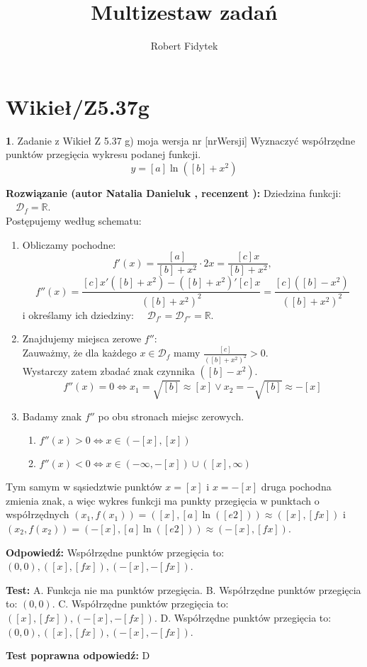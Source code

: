 \documentclass[12pt, a4paper]{article}
\title{Multizestaw zadań}
\author{Robert Fidytek}
\date{}
\theoremstyle{definition} %
\newtheorem{zad}{}
\newcommand{\kategoria}[1]{\section{#1}} %
\newcommand{\zadStart}[1]{\begin{zad}#1\newline} %
\newcommand{\zadStop}{\end{zad}}   %
\newcommand{\rozwStart}[2]{\noindent \textbf{Rozwiązanie (autor #1 , recenzent #2): }\newline} %
\newcommand{\rozwStop}{\newline}                                            %
\newcommand{\odpStart}{\noindent \textbf{Odpowiedź:}\newline}    %
\newcommand{\odpStop}{\newline}                                             %
\newcommand{\testStart}{\noindent \textbf{Test:}\newline} %
\newcommand{\testStop}{\newline} %
\newcommand{\kluczStart}{\noindent \textbf{Test poprawna odpowiedź:}\newline} %
\newcommand{\kluczStop}{\newline} %
\begin{document}
\maketitle

\kategoria{Wikieł/Z5.37g}

\zadStart{Zadanie z Wikieł Z 5.37 g) moja wersja nr [nrWersji]}
Wyznaczyć współrzędne punktów przegięcia wykresu podanej funkcji.
$$y = [a]\ln ([b] + x^2)$$
\zadStop

\rozwStart{Natalia Danieluk}{}
Dziedzina funkcji: $\quad \mathcal{D}_f=\mathbb{R}$. \\
Postępujemy według schematu:
\begin{enumerate}
\item Obliczamy pochodne: 
$$f'(x) = \frac{[a]}{[b] + x^2} \cdot 2x = \frac{[c]x}{[b] + x^2},$$ 
$$f''(x) = \frac{[c]x'([b] + x^2) - ([b] + x^2)'[c]x}{([b] + x^2)^2} = \frac{[c]([b] - x^2)}{([b] + x^2)^2}$$
i określamy ich dziedziny: $\quad \mathcal{D}_{f'}=\mathcal{D}_{f''}=\mathbb{R}$. \\
\item Znajdujemy miejsca zerowe $f''$: \\
Zauważmy, że dla każdego $x \in \mathcal{D}_f$ mamy $\frac{[c]}{([b] + x^2)^2} > 0$. \\
Wystarczy zatem zbadać znak czynnika $([b] - x^2)$. \\
$$f''(x)=0 \Leftrightarrow x_1=\sqrt{[b]}\approx[x] \vee x_2=-\sqrt{[b]}\approx-[x]$$
\item Badamy znak $f''$ po obu stronach miejsc zerowych. \\
	\begin{enumerate}
	\item $f''(x) > 0 \Leftrightarrow x \in (-[x],[x])$\\
	\item $f''(x) < 0 \Leftrightarrow x \in (-\infty,-[x])\cup([x],\infty)$
	\end{enumerate}
\end{enumerate}
Tym samym w sąsiedztwie punktów $x=[x]$ i $x=-[x]$ druga pochodna zmienia znak, a więc wykres funkcji ma punkty przegięcia w punktach o współrzędnych $(x_1,f(x_1)) = ([x],[a] \ln ([e2])) \approx ([x],[fx])$ i $(x_2,f(x_2)) = (-[x],[a] \ln ([e2])) \approx (-[x],[fx])$.
\rozwStop

\odpStart
Współrzędne punktów przegięcia to: $(0,0), ([x],[fx]), (-[x],-[fx])$.
\odpStop

\testStart
A. Funkcja nie ma punktów przegięcia.
B. Współrzędne punktów przegięcia to: $(0,0)$.
C. Współrzędne punktów przegięcia to:  $([x],[fx]), (-[x],-[fx])$.
D. Współrzędne punktów przegięcia to:  $(0,0), ([x],[fx]), (-[x],-[fx])$.
\testStop

\kluczStart
D
\kluczStop
\end{document}
